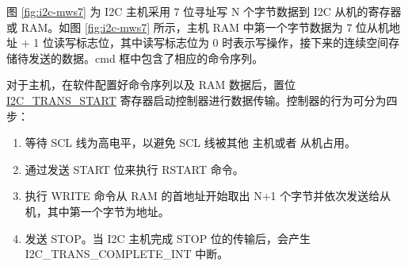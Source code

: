 \documentclass[main\_\_CN.tex]{subfiles}
\begin{document}
图 \ref{fig:i2c-mws7} 为 I2C 主机采用 7 位寻址写 N 个字节数据到 I2C 从机的寄存器或 RAM。如图 \ref{fig:i2c-mws7} 所示，主机 RAM 中第一个字节数据为 7 位从机地址 + 1 位读写标志位，其中读写标志位为 0 时表示写操作，接下来的连续空间存储待发送的数据。cmd 框中包含了相应的命令序列。 

对于主机，在软件配置好命令序列以及 RAM 数据后，置位 \hyperref[fielddesc:I2CTRANSSTART]{I2C\_TRANS\_START} 寄存器启动控制器进行数据传输。控制器的行为可分为四步：
\begin{enumerate}
    \item 等待 SCL 线为高电平，以避免 SCL 线被其他 主机或者 从机占用。
    \item 通过发送 START 位来执行 RSTART 命令。
    \item 执行 WRITE 命令从 RAM 的首地址开始取出 N+1 个字节并依次发送给从机，其中第一个字节为地址。
    \item 发送 STOP。当 I2C 主机完成 STOP 位的传输后，会产生 I2C\_TRANS\_COMPLETE\_INT 中断。
\end{enumerate}
\end{document}
